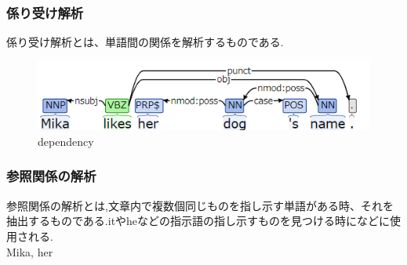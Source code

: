 \documentclass[uplatex,a4j]{jsreport}
\begin{document}
\subsubsection{係り受け解析}
係り受け解析とは、単語間の関係を解析するものである.\\
\begin{figure}[h]
  \centering
  \includegraphics[keepaspectratio, scale=1.0]
       {figure/dependency.png}
  \caption{dependency}
  \label{dependency}
\end{figure}
\subsubsection{参照関係の解析}
参照関係の解析とは,文章内で複数個同じものを指し示す単語がある時、それを抽出するものである.itやheなどの指示語の指し示すものを見つける時になどに使用される.\\
Mika, her
\end{document}
